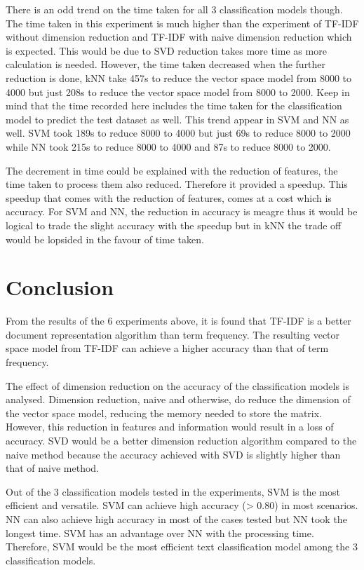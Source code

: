There is an odd trend on the time taken for all 3 classification models though. The time taken in this experiment is much higher than the experiment of TF-IDF without dimension reduction and TF-IDF with naive dimension reduction which is expected. This would be due to SVD reduction takes more time as more calculation is needed. However, the time taken decreased when the further reduction is done, kNN take 457s to reduce the vector space model from 8000 to 4000 but just 208s to reduce the vector space model from 8000 to 2000. Keep in mind that the time recorded here includes the time taken for the classification model to predict the test dataset as well. This trend appear in SVM and NN as well. SVM took 189s to reduce 8000 to 4000 but just 69s to reduce 8000 to 2000 while NN took 215s to reduce 8000 to 4000 and 87s to reduce 8000 to 2000. 

The decrement in time could be explained with the reduction of features, the time taken to process them also reduced. Therefore it provided a speedup. This speedup that comes with the reduction of features, comes at a cost which is accuracy. For SVM and NN, the reduction in accuracy is meagre thus it would be logical to trade the slight accuracy with the speedup but in kNN the trade off would be lopsided in the favour of time taken.

\clearpage
\section{Conclusion}
From the results of the 6 experiments above, it is found that TF-IDF is a better document representation algorithm than term frequency. The resulting vector space model from TF-IDF can achieve a higher accuracy than that of term frequency. 

The effect of dimension reduction on the accuracy of the classification models is analysed. Dimension reduction, naive and otherwise, do reduce the dimension of the vector space model, reducing the memory needed to store the matrix. However, this reduction in features and information would result in a loss of accuracy. SVD would be a better dimension reduction algorithm compared to the naive method because the accuracy achieved with SVD is slightly higher than that of naive method.

Out of the 3 classification models tested in the experiments, SVM is the most efficient and versatile. SVM can achieve high accuracy (> 0.80) in most scenarios. NN can also achieve high accuracy in most of the cases tested but NN took the longest time. SVM has an advantage over NN with the processing time. Therefore, SVM would be the most efficient text classification model among the 3 classification models.

